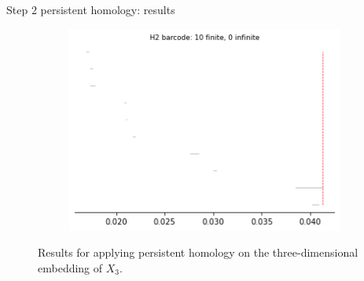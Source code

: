 \documentclass[xcolor={dvipsnames,svgnames}]{beamer}
\begin{document}
\begin{frame}{Step 2 persistent homology: results}
\begin{figure}[H]
\begin{subfigure}[b]{0.2\textwidth}
\includegraphics[width=\textwidth]{figures/X3_H2_barcode.png}
 \caption{}
\end{subfigure}
\caption{Results for applying persistent homology on the three-dimensional embedding of $X_3$.}
\end{figure}
\end{frame}
\end{document}
